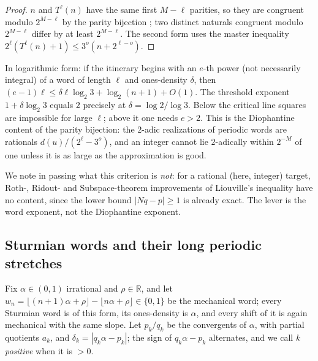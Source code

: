 \documentclass[11pt]{article}
\theoremstyle{definition}
\newcommand{\R}{\mathbb{R}}
\begin{document}
\begin{proof}
$n$ and $T^\ell(n)$ have the same first $M - \ell$ parities, so they
are congruent modulo $2^{M-\ell}$ by the parity bijection
\cite{companion}; two distinct naturals congruent modulo $2^{M-\ell}$
differ by at least $2^{M-\ell}$. The second form uses the master
inequality $2^\ell (T^\ell(n) + 1) \le 3^o (n + 2^{\ell - o})$.
\end{proof}

In logarithmic form: if the itinerary begins with an $e$-th power (not
necessarily integral) of a word of length $\ell$ and ones-density
$\delta$, then $(e - 1)\ell \le \delta \ell \log_2 3 + \log_2(n+1) +
O(1)$. The threshold exponent $1 + \delta \log_2 3$ equals $2$
precisely at $\delta = \log 2/\log 3$. Below the critical line squares
are impossible for large $\ell$; above it one needs $e > 2$. This is
the Diophantine content of the parity bijection: the $2$-adic
realizations of periodic words are rationals $d(u)/(2^\ell - 3^o)$,
and an integer cannot lie $2$-adically within $2^{-M}$ of one unless
it is as large as the approximation is good.

We note in passing what this criterion is \emph{not}: for a rational
(here, integer) target, Roth-, Ridout- and Subspace-theorem
improvements of Liouville's inequality have no content, since the
lower bound $|Nq - p| \ge 1$ is already exact. The lever is the word
exponent, not the Diophantine exponent.

\subsection{Sturmian words and their long periodic stretches}

Fix $\alpha \in (0,1)$ irrational and $\rho \in \R$, and let
$w_n = \lfloor (n+1)\alpha + \rho\rfloor - \lfloor n\alpha + \rho\rfloor
\in \{0,1\}$ be the mechanical word; every Sturmian word is of this
form, its ones-density is $\alpha$, and every shift of it is again
mechanical with the same slope. Let $p_k/q_k$ be the convergents of
$\alpha$, with partial quotients $a_k$, and $\delta_k = |q_k\alpha -
p_k|$; the sign of $q_k\alpha - p_k$ alternates, and we call $k$
\emph{positive} when it is $> 0$.
\end{document}
